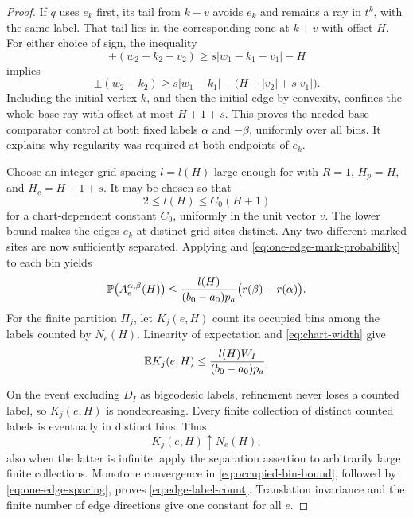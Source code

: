 \begin{proof}
If $q$ uses $e_k$ first, its tail from $k+v$ avoids $e_k$ and remains a
ray in $t^k$, with the same label.  That tail lies in the corresponding
cone at $k+v$ with offset $H$.  For either choice of sign, the inequality
\[
 \pm(w_2-k_2-v_2)\ge s|w_1-k_1-v_1|-H
\]
implies
\[
 \pm(w_2-k_2)
 \ge s|w_1-k_1|-\bigl(H+|v_2|+s|v_1|\bigr).
\]
Including the initial vertex $k$, and then the initial edge by convexity,
confines the whole base ray with offset at most $H+1+s$.
This proves the needed base comparator control at both fixed labels
$\alpha$ and $-\beta$, uniformly over all bins.  It explains why
regularity was required at both endpoints of $e_k$.

Choose an integer grid spacing $l=l(H)$ large enough for
 with $R=1$, $H_p=H$, and $H_c=H+1+s$.
It may be chosen so that
\begin{equation}\label{eq:one-edge-spacing}
 2\le l(H)\le C_0(H+1)
\end{equation}
for a chart-dependent constant $C_0$, uniformly in the unit vector $v$.
The lower bound makes the edges $e_k$ at distinct grid sites distinct.
Any two different marked sites are now sufficiently separated.  Applying
 and
\eqref{eq:one-edge-mark-probability} to each bin yields
\[
 \mathbb P\bigl(A_e^{\alpha,\beta}(H)\bigr)
 \le\frac{l(H)}{(b_0-a_0)p_a}
       \bigl(r(\beta)-r(\alpha)\bigr).
\]
For the finite partition $\Pi_j$, let $K_j(e,H)$ count its occupied bins
among the labels counted by $N_e(H)$.  Linearity of expectation and
\eqref{eq:chart-width} give
\begin{equation}\label{eq:occupied-bin-bound}
 \mathbb E K_j(e,H)
 \le\frac{l(H)W_I}{(b_0-a_0)p_a}.
\end{equation}

On the event excluding $D_I$ as bigeodesic labels, refinement never loses a
counted label, so $K_j(e,H)$ is nondecreasing.  Every finite collection of
distinct counted labels is eventually in distinct bins.  Thus
\[
 K_j(e,H)\uparrow N_e(H),
\]
also when the latter is infinite: apply the separation assertion to
arbitrarily large finite collections.  Monotone convergence in
\eqref{eq:occupied-bin-bound}, followed by \eqref{eq:one-edge-spacing},
proves \eqref{eq:edge-label-count}.  Translation invariance and the
finite number of edge directions give one constant for all $e$.
\end{proof}
